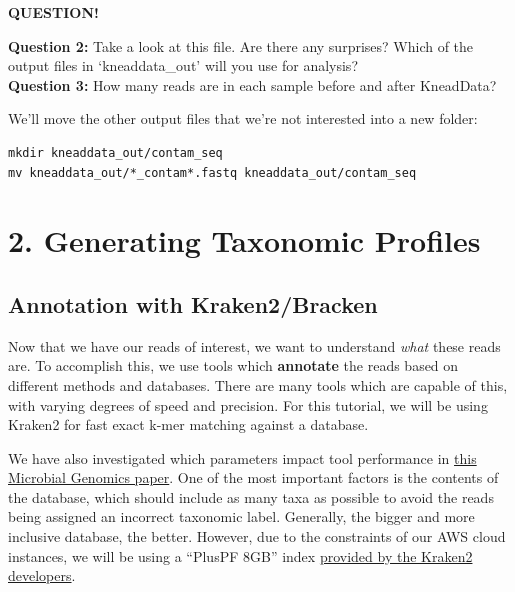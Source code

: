 \documentclass[
]{book}
\newenvironment{bluebox}{
  \definecolor{shadecolor}{RGB}{172, 210, 237}
  \color{white}
  \begin{shaded}}
 {\end{shaded}}
\begin{document}
\begin{bluebox}

\begin{center}
\textbf{QUESTION!}

\end{center}

\textbf{Question 2:} Take a look at this file. Are there any surprises? Which of the output files in `kneaddata\_out' will you use for analysis?\\
\textbf{Question 3:} How many reads are in each sample before and after KneadData?

\end{bluebox}

We'll move the other output files that we're not interested into a new folder:

\begin{verbatim}
mkdir kneaddata_out/contam_seq
mv kneaddata_out/*_contam*.fastq kneaddata_out/contam_seq
\end{verbatim}

\section{2. Generating Taxonomic Profiles}\label{generating-taxonomic-profiles}

\subsection{Annotation with Kraken2/Bracken}\label{annotation-with-kraken2bracken}

Now that we have our reads of interest, we want to understand \emph{what} these reads are. To accomplish this, we use tools which \textbf{annotate} the reads based on different methods and databases. There are many tools which are capable of this, with varying degrees of speed and precision. For this tutorial, we will be using Kraken2 for fast exact k-mer matching against a database.

We have also investigated which parameters impact tool performance in \href{https://pubmed.ncbi.nlm.nih.gov/36867161/}{this Microbial Genomics paper}. One of the most important factors is the contents of the database, which should include as many taxa as possible to avoid the reads being assigned an incorrect taxonomic label. Generally, the bigger and more inclusive database, the better. However, due to the constraints of our AWS cloud instances, we will be using a ``PlusPF 8GB'' index \href{https://benlangmead.github.io/aws-indexes/k2}{provided by the Kraken2 developers}.
\end{document}
